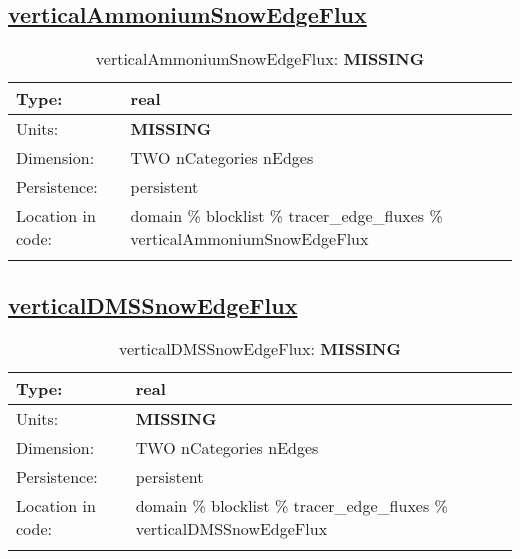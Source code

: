 \subsection[verticalAmmoniumSnowEdgeFlux]{\hyperref[sec:var_tab_tracer_edge_fluxes]{verticalAmmoniumSnowEdgeFlux}}
\label{subsec:var_sec_tracer_edge_fluxes_verticalAmmoniumSnowEdgeFlux}
\begin{center}
\begin{longtable}{| p{2.0in} | p{4.0in} |}
        \hline 
        Type: & real \\
        \hline 
        Units: & {\bf \color{red} MISSING} \\
        \hline 
        Dimension: & TWO nCategories nEdges \\
        \hline 
        Persistence: & persistent \\
        \hline 
         Location in code: & domain \% blocklist \% tracer\_edge\_fluxes \% verticalAmmoniumSnowEdgeFlux \\
         \hline 
    \caption{verticalAmmoniumSnowEdgeFlux: {\bf \color{red} MISSING}}
\end{longtable}
\end{center}
\subsection[verticalDMSSnowEdgeFlux]{\hyperref[sec:var_tab_tracer_edge_fluxes]{verticalDMSSnowEdgeFlux}}
\label{subsec:var_sec_tracer_edge_fluxes_verticalDMSSnowEdgeFlux}
\begin{center}
\begin{longtable}{| p{2.0in} | p{4.0in} |}
        \hline 
        Type: & real \\
        \hline 
        Units: & {\bf \color{red} MISSING} \\
        \hline 
        Dimension: & TWO nCategories nEdges \\
        \hline 
        Persistence: & persistent \\
        \hline 
         Location in code: & domain \% blocklist \% tracer\_edge\_fluxes \% verticalDMSSnowEdgeFlux \\
         \hline 
    \caption{verticalDMSSnowEdgeFlux: {\bf \color{red} MISSING}}
\end{longtable}
\end{center}
